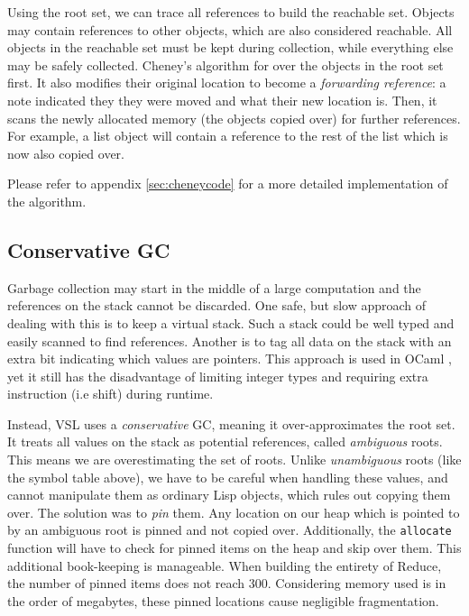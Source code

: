Using the root set, we can trace all references to build the reachable set. Objects may contain references
to other objects, which are also considered reachable.
All objects in the reachable set must be kept during collection, while everything else may be safely collected.
Cheney's algorithm for over the objects in the root set first. It also modifies their original location to become
a \emph{forwarding reference}: a note indicated they they were moved and what their new location is. Then, it scans
the newly allocated memory (the objects copied over) for further references.
For example, a list object will contain a reference to the rest of the list which is now also copied over.

Please refer to appendix \ref{sec:cheneycode} for a more detailed implementation of the algorithm.

\subsection{Conservative GC}

Garbage collection may start in the middle of a large computation and the references on the stack cannot be discarded.
One safe, but slow approach of dealing with this is to keep a virtual stack. Such a stack could be well typed and easily scanned to find
references. Another is to tag all data on the stack with an extra bit indicating which values are pointers. This approach
is used in OCaml \cite[Chapter~20]{rwoc}, yet it still has the disadvantage of limiting integer types and requiring extra
instruction (i.e shift) during runtime.

Instead, VSL uses a \emph{conservative} GC, meaning it over-approximates the root set.
It treats all values on the stack as potential references, called \emph{ambiguous} roots.
This means we are overestimating the set of roots. Unlike \emph{unambiguous} roots (like the symbol table above), we
have to be careful when handling these values, and cannot manipulate them as ordinary Lisp objects, which rules out
copying them over. The solution was
to \emph{pin} them. Any location on our heap which is pointed to by an ambiguous root is pinned and not copied over.
Additionally, the \texttt{allocate} function will have to check for pinned items on the heap and skip over them. This
additional book-keeping is manageable. When building the entirety of Reduce, the number of pinned items does not reach 300.
Considering memory used is in the order of megabytes, these pinned locations cause negligible fragmentation.

